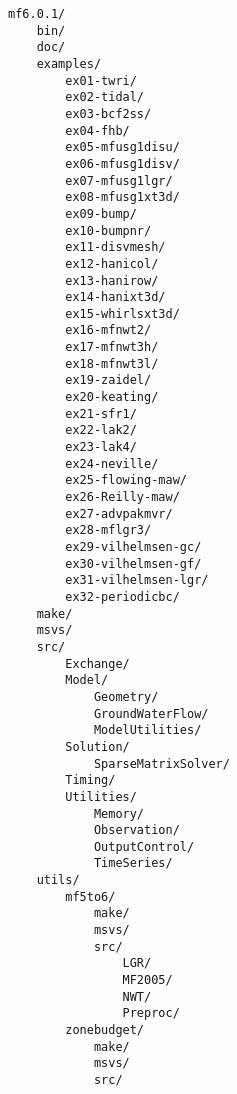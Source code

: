 \begin{verbatim}
mf6.0.1/ 
    bin/ 
    doc/ 
    examples/ 
        ex01-twri/ 
        ex02-tidal/ 
        ex03-bcf2ss/ 
        ex04-fhb/ 
        ex05-mfusg1disu/ 
        ex06-mfusg1disv/ 
        ex07-mfusg1lgr/ 
        ex08-mfusg1xt3d/ 
        ex09-bump/ 
        ex10-bumpnr/ 
        ex11-disvmesh/ 
        ex12-hanicol/ 
        ex13-hanirow/ 
        ex14-hanixt3d/ 
        ex15-whirlsxt3d/ 
        ex16-mfnwt2/ 
        ex17-mfnwt3h/ 
        ex18-mfnwt3l/ 
        ex19-zaidel/ 
        ex20-keating/ 
        ex21-sfr1/ 
        ex22-lak2/ 
        ex23-lak4/ 
        ex24-neville/ 
        ex25-flowing-maw/ 
        ex26-Reilly-maw/ 
        ex27-advpakmvr/ 
        ex28-mflgr3/ 
        ex29-vilhelmsen-gc/ 
        ex30-vilhelmsen-gf/ 
        ex31-vilhelmsen-lgr/ 
        ex32-periodicbc/ 
    make/ 
    msvs/ 
    src/ 
        Exchange/ 
        Model/ 
            Geometry/ 
            GroundWaterFlow/ 
            ModelUtilities/ 
        Solution/ 
            SparseMatrixSolver/ 
        Timing/ 
        Utilities/ 
            Memory/ 
            Observation/ 
            OutputControl/ 
            TimeSeries/ 
    utils/ 
        mf5to6/ 
            make/ 
            msvs/ 
            src/ 
                LGR/ 
                MF2005/ 
                NWT/ 
                Preproc/ 
        zonebudget/ 
            make/ 
            msvs/ 
            src/ 
\end{verbatim}
